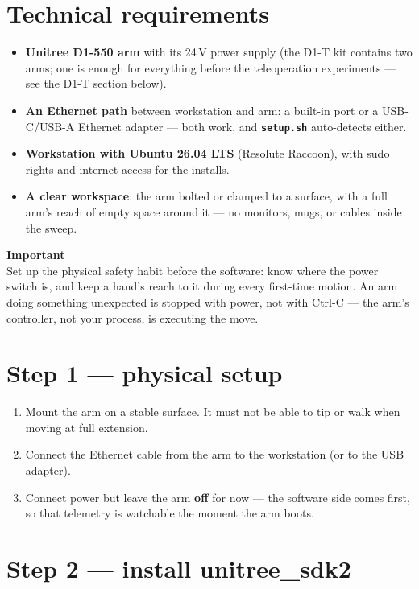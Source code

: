 \documentclass[11pt,twoside,openright]{book}
\newcommand{\code}[1]{\texttt{\bfseries #1}}
\newenvironment{pktimportant}{\begin{pktbox}\textbf{Important}\\[4pt]}{\end{pktbox}}
\begin{document}
\section{Technical requirements}

\begin{itemize}
  \item \textbf{Unitree D1-550 arm} with its 24\,V power supply (the
    D1-T kit contains two arms; one is enough for everything before the
    teleoperation experiments --- see the D1-T section below).
  \item \textbf{An Ethernet path} between workstation and arm: a built-in
    port or a USB-C/USB-A Ethernet adapter --- both work, and
    \code{setup.sh} auto-detects either.
  \item \textbf{Workstation with Ubuntu 26.04 LTS} (Resolute Raccoon),
    with sudo rights and internet access for the installs.
  \item \textbf{A clear workspace}: the arm bolted or clamped to a
    surface, with a full arm's reach of empty space around it --- no
    monitors, mugs, or cables inside the sweep.
\end{itemize}

\begin{pktimportant}
Set up the physical safety habit before the software: know where the
power switch is, and keep a hand's reach to it during every first-time
motion. An arm doing something unexpected is stopped with power, not with
Ctrl-C --- the arm's controller, not your process, is executing the move.
\end{pktimportant}

\section{Step 1 --- physical setup}

\begin{enumerate}
  \item Mount the arm on a stable surface. It must not be able to tip or
    walk when moving at full extension.
  \item Connect the Ethernet cable from the arm to the workstation (or
    to the USB adapter).
  \item Connect power but leave the arm \textbf{off} for now --- the
    software side comes first, so that telemetry is watchable the moment
    the arm boots.
\end{enumerate}

\section{Step 2 --- install unitree\_sdk2}
\end{document}
